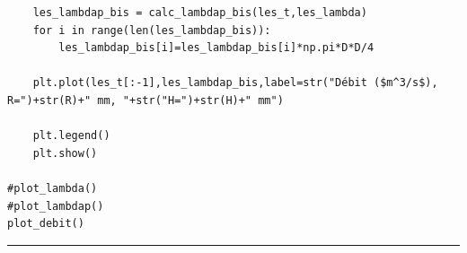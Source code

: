 \begin{corrigebox}
\begin{lstlisting}
    les_lambdap_bis = calc_lambdap_bis(les_t,les_lambda)
    for i in range(len(les_lambdap_bis)):
        les_lambdap_bis[i]=les_lambdap_bis[i]*np.pi*D*D/4

    plt.plot(les_t[:-1],les_lambdap_bis,label=str("Débit ($m^3/s$), R=")+str(R)+" mm, "+str("H=")+str(H)+" mm")

    plt.legend()
    plt.show()
    
#plot_lambda()
#plot_lambdap()
plot_debit()

\end{lstlisting}
\noindent\hrule
\end{corrigebox}
